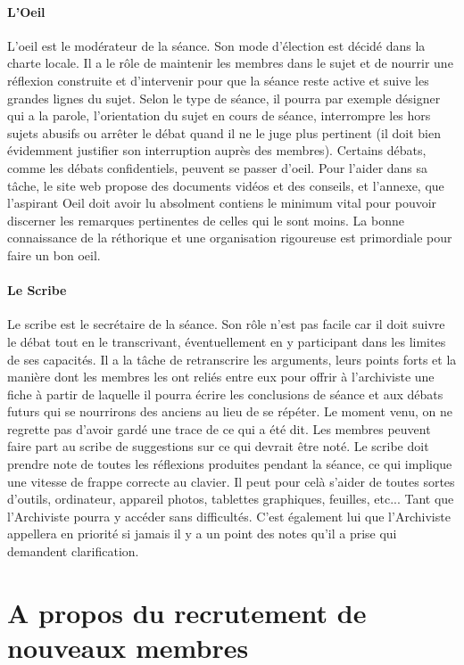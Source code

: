 \documentclass[a4paper,12pt]{article}
\begin{document}
\paragraph{L'Oeil}
L'oeil est le modérateur de la séance. Son mode d'élection est décidé dans la charte locale. Il a le rôle de maintenir les membres dans le sujet et de nourrir une réflexion construite et d'intervenir pour que la séance reste active et suive les grandes lignes du sujet. Selon le type de séance, il pourra par exemple désigner qui a la parole, l'orientation du sujet en cours de séance, interrompre les hors sujets abusifs ou arrêter le débat quand il ne le juge plus pertinent (il doit bien évidemment justifier son interruption auprès des membres). Certains débats, comme les débats confidentiels, peuvent se passer d'oeil. Pour l'aider dans sa tâche, le site web propose des documents vidéos et des conseils, et l'annexe, que l'aspirant Oeil doit avoir lu absolment contiens le minimum vital pour pouvoir discerner les remarques pertinentes de celles qui le sont moins. La bonne connaissance de la réthorique et une organisation rigoureuse est primordiale pour faire un bon oeil. 

\paragraph{Le Scribe}
Le scribe est le secrétaire de la séance. Son rôle n'est pas facile car il doit suivre le débat tout en le transcrivant, éventuellement en y participant dans les limites de ses capacités. Il a la tâche de retranscrire les arguments, leurs points forts et la manière dont les membres les ont reliés entre eux pour offrir à l'archiviste une fiche à partir de laquelle il pourra écrire les conclusions de séance et aux débats futurs qui se nourrirons des anciens au lieu de se répéter. Le moment venu, on ne regrette pas d'avoir gardé une trace de ce qui a été dit. Les membres peuvent faire part au scribe de suggestions sur ce qui devrait être noté. Le scribe doit prendre note de toutes les réflexions produites pendant la séance, ce qui implique une vitesse de frappe correcte au clavier. Il peut pour celà s'aider de toutes sortes d'outils, ordinateur, appareil photos, tablettes graphiques, feuilles, etc... Tant que l'Archiviste pourra y accéder sans difficultés. C'est également lui que l'Archiviste appellera en priorité si jamais il y a un point des notes qu'il a prise qui demandent clarification.

\section{A propos du recrutement de nouveaux membres}
\end{document}
